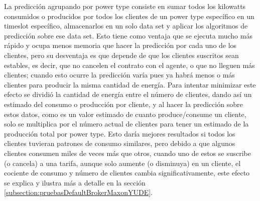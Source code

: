 La predicción agrupando por power type consiste en sumar todos los kilowatts consumidos o producidos por todos los clientes de un power type específico en un timeslot específico, almacenarlos en un solo data set y aplicar los algoritmos de predicción sobre ese data set. 
Esto tiene como ventaja que se ejecuta mucho más rápido y ocupa menos memoria que hacer la predicción por cada uno de los clientes, pero su desventaja es que depende de que los clientes suscritos sean estables, es decir, que no cancelen el contrato con el agente, o que no lleguen más clientes; cuando esto ocurre la predicción varía pues ya habrá menos o más clientes para producir la misma cantidad de energía. 
Para  intentar minimizar este efecto se dividió la cantidad de energía entre el número de clientes, dando así un estimado del consumo o producción por cliente, y al hacer la predicción sobre estos datos, como es un valor estimado de cuanto produce/consume un cliente, solo se multiplica por el número actual de clientes para tener un estimado de la producción total por power type. 
Esto daría mejores resultados si todos los clientes tuvieran patrones de consumo similares, pero debido a que algunos clientes consumen miles de veces más que otros, cuando uno de estos se suscribe (o cancela) a una tarifa, aunque solo aumente (o disminuya) en un cliente, el cociente de consumo y número de clientes cambia significativamente, este efecto se explica y ilustra más a detalle en la sección \ref{subsection:pruebasDefaultBrokerMaxonYUDE}.

